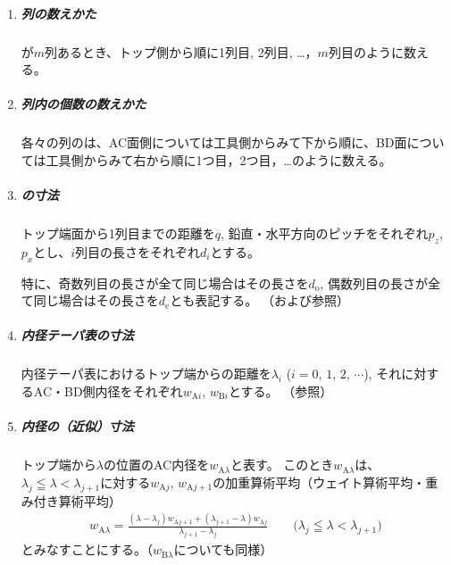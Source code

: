 \begin{tcolorbox}[title={\dimple に関する表記法}, fonttitle=\gtfamily\bfseries, breakable, enhanced jigsaw]
\begin{enumerate}
\item
\subparagraph*{列の数えかた}
\dimple が$m$列あるとき、トップ側から順に1列目, 2列目, …，$m$列目のように数える。

\item
\subparagraph*{列内の個数の数えかた}
各々の列の\dimple は、AC面側については工具側からみて下から順に、BD面については工具側からみて右から順に1つ目，2つ目，…のように数える。

\item
\subparagraph*{\dimple の寸法}
トップ端面から1列目までの距離を$q$, 鉛直・水平方向のピッチをそれぞれ$p_z$, $p_x$とし、$i$列目の長さをそれぞれ$d_i$とする。

特に、奇数列目の長さが全て同じ場合はその長さを$d_\mathrm o$, 偶数列目の長さが全て同じ場合はその長さを$d_\mathrm e$とも表記する。
（および参照）

\item
\subparagraph*{内径テーパ表の寸法}
内径テーパ表におけるトップ端からの距離を$\lambda_i$ ($i = 0$, $1$, $2$, $\cdots$), それに対するAC・BD側内径をそれぞれ$w_{\mathrm Ai}$, $w_{\mathrm Bi}$とする。
（参照）

\item
\subparagraph*{内径の（近似）寸法}
トップ端から$\lambda$の位置のAC内径を$w_{\mathrm A\lambda}$と表す。
このとき$w_{\mathrm A\lambda}$は、$\lambda_j \leqq \lambda < \lambda_{j+1}$に対する$w_{\mathrm Aj}$, $w_{\mathrm Aj+1}$の加重算術平均（ウェイト算術平均・重み付き算術平均）
\begin{align*}
  w_{\mathrm A\lambda}
  = \frac{(\lambda-\lambda_j)w_{\mathrm Aj+1}+(\lambda_{j+1}-\lambda)w_{\mathrm Aj}}{\lambda_{j+1}-\lambda_j}
  \qquad
  \Big(\lambda_j \leqq \lambda < \lambda_{j+1}\Big)
\end{align*}
とみなすことにする。（$w_{\mathrm B\lambda}$についても同様）


\end{enumerate}
\end{tcolorbox}
